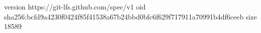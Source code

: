 version https://git-lfs.github.com/spec/v1
oid sha256:bcfd9a4230f0424f85f41538a67b24bbd0bfc6f629f717911a70991b4df6ceeb
size 18589
